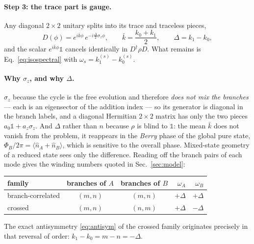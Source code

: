 \documentclass[11pt]{article}
\newcommand{\nop}{\hat n}
\begin{document}
\paragraph{Step 3: the trace part is gauge.}
Any diagonal $2\times2$ unitary splits into its trace and traceless pieces,
\begin{equation}
D(\phi)=e^{i\bar k\phi}\,e^{-i\frac{\Delta}{2}\sigma_z\phi},\qquad
\bar k=\frac{k_0+k_1}{2},\qquad \Delta=k_1-k_0 ,
\end{equation}
and the scalar $e^{i\bar k\phi}\mathbb 1$ cancels identically in
$D^\dagger\rho D$. What remains is Eq.~\eqref{eq:isospectral} with
$\omega_s=k_1^{(s)}-k_0^{(s)}$.

\paragraph{Why $\sigma_z$, and why $\Delta$.}
$\sigma_z$ because the cycle is the free evolution and therefore \emph{does not
mix the branches} --- each is an eigensector of the addition index --- so its
generator is diagonal in the branch labels, and a diagonal Hermitian
$2\times2$ matrix has only the two pieces $a_0\mathbb 1+a_z\sigma_z$. And
$\Delta$ rather than $n$ because $\rho$ is blind to $\mathbb 1$: the mean
$\bar k$ does not vanish from the problem, it reappears in the \emph{Berry}
phase of the global pure state, $\Phi_B/2\pi=\langle\nop_A+\nop_B\rangle$,
which is sensitive to the overall phase. Mixed-state geometry of a reduced
state sees only the difference. Reading off the branch pairs of each mode gives
the winding numbers quoted in Sec.~\ref{sec:model}:
\begin{center}
\begin{tabular}{lccrr}
\toprule
family & branches of $A$ & branches of $B$ & $\omega_A$ & $\omega_B$\\
\midrule
branch-correlated & $(m,n)$ & $(m,n)$ & $+\Delta$ & $+\Delta$\\
crossed & $(m,n)$ & $(n,m)$ & $+\Delta$ & $-\Delta$\\
\bottomrule
\end{tabular}
\end{center}
The exact antisymmetry \eqref{eq:antisym} of the crossed family originates
precisely in that reversal of order: $k_1-k_0=m-n=-\Delta$.
\end{document}
